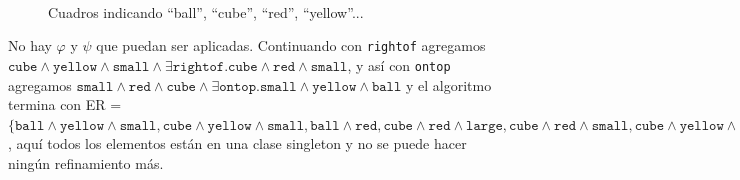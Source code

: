 \begin{figure}[ht]
\begin{center}
\\[0pt]
\caption{Cuadros indicando ``ball'', ``cube'', ``red'', ``yellow''...}
\label{fig-modelo15}
\end{center}
\end{figure}


No hay
$\varphi$ y $\psi$ que puedan ser aplicadas. Continuando con \texttt{rightof} agregamos $\texttt{cube} \wedge \texttt{yellow} \wedge \texttt{small} \wedge \exists \texttt{rightof}. \texttt{cube} \wedge \texttt{red} \wedge \texttt{small}$, y as\'i con \texttt{ontop} agregamos $\texttt{small} \wedge \texttt{red} \wedge \texttt{cube} \wedge \exists \texttt{ontop}. \texttt{small} \wedge \texttt{yellow} \wedge \texttt{ball}$ y el algoritmo termina con ER = $\{\texttt{ball} \wedge \texttt{yellow} \wedge \texttt{small}, \texttt{cube} \wedge \texttt{yellow} \wedge \texttt{small}, \texttt{ball} \wedge \texttt{red}, \texttt{cube} \wedge \texttt{red} \wedge \texttt{large}, \texttt{cube} \wedge \texttt{red} \wedge \texttt{small}, \texttt{cube} \wedge \texttt{yellow} \wedge \texttt{small} \wedge \exists \texttt{rightof}. \texttt{cube} \wedge \texttt{red} \wedge \texttt{small}, \texttt{small} \wedge \texttt{red} \wedge \texttt{cube} \wedge \exists \texttt{ontop}. \texttt{small} \wedge \texttt{yellow} \wedge \texttt{ball}\}$, 
aqu\'i todos los elementos est\'an en una clase singleton y no se puede hacer ning\'un refinamiento m\'as. 

